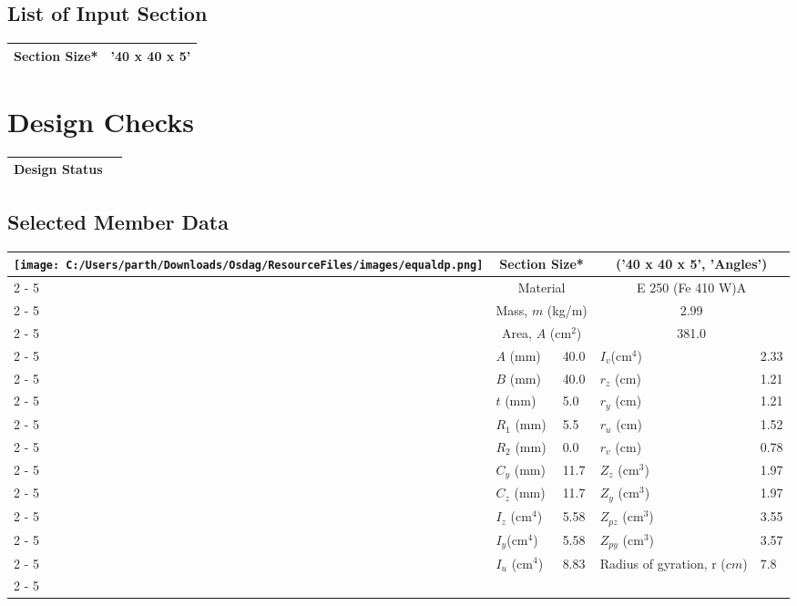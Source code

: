 \documentclass{article}%
\begin{document}
\subsection{List of Input Section}%
\label{subsec:ListofInputSection}%
\renewcommand{\arraystretch}{1.2}%
\begin{tabularx}{\textwidth}{|p{4cm}|X|}%
\hline%
\multicolumn{1}{|c|}{Section Size*}&\multicolumn{1}{|X|}{'40 x 40 x 5'}\\%
\hline%
\end{tabularx}

%
%
\newpage%
\section{Design Checks}%
\label{sec:DesignChecks}%
\renewcommand{\arraystretch}{1.2}%
\begin{tabularx}{\textwidth}{|>{\centering}p{12.5cm}|>{\centering\arraybackslash}X|}%
\hline%
\textbf{Design Status}&\cellcolor{Red}{\textbf{Fail}}\\%
\hline%
\end{tabularx}%
\subsection{Selected Member Data}%
\label{subsec:SelectedMemberData}%
\renewcommand{\arraystretch}{1.2}%
\begin{longtable}{|p{5cm}|p{2cm}|p{2cm}|p{2cm}|p{4cm}|}%
\hline%
\hline%
\multirow{14}{*}{\texttt{[image: C:/Users/parth/Downloads/Osdag/ResourceFiles/images/equaldp.png]}}&\multicolumn{2}{|c|}{Section Size*}&\multicolumn{2}{|c|}{('40 x 40 x 5', 'Angles')}\\%
\cline{2%
-%
5}%
&\multicolumn{2}{|c|}{Material}&\multicolumn{2}{|c|}{E 250 (Fe 410 W)A}\\%
\cline{2%
-%
5}%
&\multicolumn{2}{|c|}{Mass, $m$ (kg/m)}&\multicolumn{2}{|c|}{2.99}\\%
\cline{2%
-%
5}%
&\multicolumn{2}{|c|}{Area, $A$ (cm$^2$)}&\multicolumn{2}{|c|}{381.0}\\%
\cline{2%
-%
5}%
&$A$ (mm)&40.0&$I_v$(cm$^4$)&2.33\\%
\cline{2%
-%
5}%
&$B$ (mm)&40.0&$r_z$ (cm)&1.21\\%
\cline{2%
-%
5}%
&$t$ (mm)&5.0&$r_y$ (cm)&1.21\\%
\cline{2%
-%
5}%
&$R_1$ (mm)&5.5&$r_u$ (cm)&1.52\\%
\cline{2%
-%
5}%
&$R_2$ (mm)&0.0&$r_v$ (cm)&0.78\\%
\cline{2%
-%
5}%
&$C_y$ (mm)&11.7&$Z_z$ (cm$^3$)&1.97\\%
\cline{2%
-%
5}%
&$C_z$ (mm)&11.7&$Z_y$ (cm$^3$)&1.97\\%
\cline{2%
-%
5}%
&$I_z$ (cm$^4$)&5.58&$Z_{pz}$ (cm$^3$)&3.55\\%
\cline{2%
-%
5}%
&$I_y$(cm$^4$)&5.58&$Z_{py}$ (cm$^3$)&3.57\\%
\cline{2%
-%
5}%
&$I_u$ (cm$^4$)&8.83&Radius of gyration, r ($cm$)&7.8\\%
\cline{2%
-%
5}%
\hline%
\end{longtable}
\end{document}
